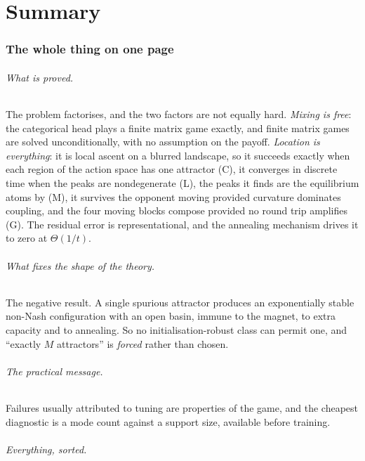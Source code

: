 \documentclass[11pt]{article}
\theoremstyle{definition}
\begin{document}
\part{Summary}

\section{The whole thing on one page}

\paragraph{What is proved.} The problem factorises, and the two factors are not
equally hard. \emph{Mixing is free}: the categorical head plays a finite matrix
game exactly, and finite matrix games are solved unconditionally, with no
assumption on the payoff. \emph{Location is everything}: it is local ascent on a
blurred landscape, so it succeeds exactly when each region of the action space has
one attractor (C), it converges in discrete time when the peaks are nondegenerate
(L), the peaks it finds are the equilibrium atoms by (M), it survives the opponent
moving provided curvature dominates coupling, and the four moving blocks compose
provided no round trip amplifies (G). The residual error is representational, and
the annealing mechanism drives it to zero at $\Theta(1/t)$.

\paragraph{What fixes the shape of the theory.} The negative result. A single
spurious attractor produces an exponentially stable non-Nash configuration with an
open basin, immune to the magnet, to extra capacity and to annealing. So no
initialisation-robust class can permit one, and ``exactly $M$ attractors'' is
\emph{forced} rather than chosen.

\paragraph{The practical message.} Failures usually attributed to tuning are
properties of the game, and the cheapest diagnostic is a mode count against a
support size, available before training.

\paragraph{Everything, sorted.}
\end{document}
